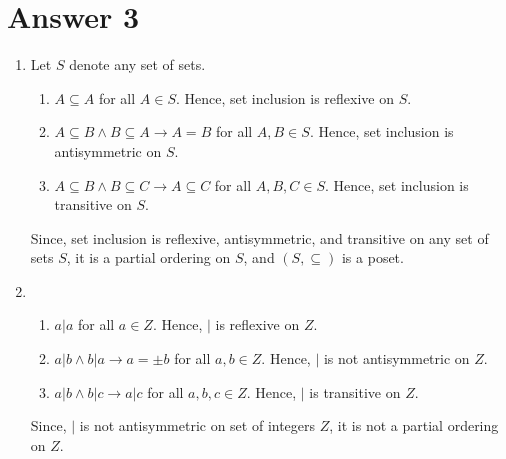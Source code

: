 \documentclass[12pt]{article}
\begin{document}
\section*{Answer 3}

\renewcommand{\theenumi}{\alph{enumi}}
\renewcommand{\theenumii}{\roman{enumii}}
\begin{enumerate}
    \item Let $S$ denote any set of sets.
    \begin{enumerate}
        \item $A \subseteq A$ for all $A \in S$. Hence, set inclusion is reflexive on $S$.
        \item $A \subseteq B \land B \subseteq A \rightarrow A = B$ for all $A, B \in S$. Hence, set inclusion is antisymmetric on $S$.
        \item $A \subseteq B \land B \subseteq C \rightarrow A \subseteq C$ for all $A, B, C \in S$. Hence, set inclusion is transitive on $S$.
    \end{enumerate}
    Since, set inclusion is reflexive, antisymmetric, and transitive on any set of sets $S$, it is a partial ordering on $S$, and $(S, \subseteq)$ is a poset.
    
    \item
    \begin{enumerate}
        \item $a | a$ for all $a \in Z$. Hence, $|$ is reflexive on $Z$.
        \item $a | b \land b | a \rightarrow a = \pm b$ for all $a, b \in Z$. Hence, $|$ is not antisymmetric on $Z$.
        \item $a | b \land b | c \rightarrow a | c$ for all $a, b, c \in Z$. Hence, $|$ is transitive on $Z$.
    \end{enumerate}
    Since, $|$ is not antisymmetric on set of integers $Z$, it is not a partial ordering on $Z$.
    

\end{enumerate}
\end{document}
